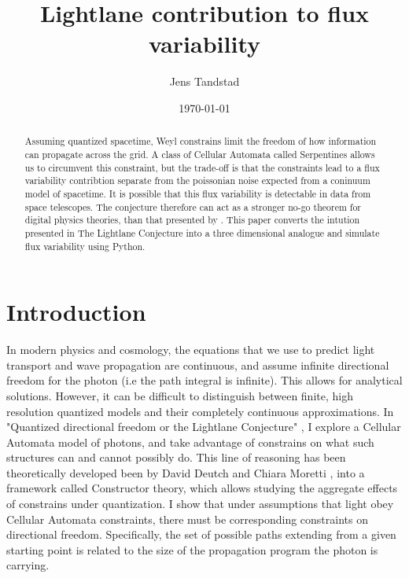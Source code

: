 \documentclass[notitlepage]{article}
\title{Lightlane contribution to flux variability}
\author{Jens Tandstad}
\date{\today}
\begin{document}
\maketitle
\thispagestyle{empty}

\begin{abstract}
Assuming quantized spacetime, Weyl constrains limit the freedom of how information can propagate across the grid. A class of Cellular Automata called Serpentines allows us to circumvent this constraint, but the trade-off is that the constraints lead to a flux variability contribtion separate from the poissonian noise expected from a coninuum model of spacetime. It is possible that this flux variability is detectable in data from space telescopes. The conjecture therefore can act as a stronger no-go theorem for digital physics theories, than that presented by \cite{FritzNoGo}. This paper converts the intution presented in  The Lightlane Conjecture \citep{RhadamantysA2} into a three dimensional analogue and simulate flux variability using Python.
\end{abstract}

\section{Introduction}
In modern physics and cosmology, the equations that we use to predict light transport and wave propagation are continuous, and assume infinite directional freedom for the photon (i.e the path integral is infinite). This allows for analytical solutions. However, it can be difficult to distinguish between finite, high resolution quantized models and their completely continuous approximations. In "Quantized directional freedom or the Lightlane Conjecture" \cite{RhadamantysA2}, I explore a Cellular Automata model of photons, and take advantage of constrains on what such structures can and cannot possibly do. This line of reasoning has been theoretically developed been by David Deutch and Chiara Moretti \cite{DeutchMoretti}, \cite{MorettiVedral} into a framework called Constructor theory, which allows studying the aggregate effects of constrains under quantization.  I show that under assumptions that light obey Cellular Automata constraints, there must be corresponding constraints on directional freedom. Specifically, the set of possible paths extending from a given starting point is related to the size of the propagation program the photon is carrying.
\end{document}
